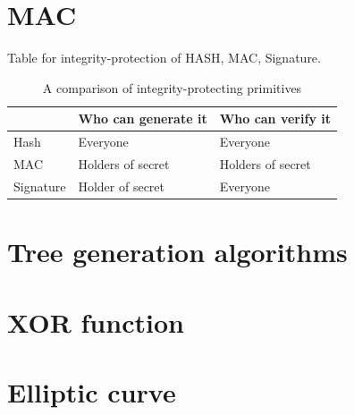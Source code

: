 \section{MAC}

Table for integrity-protection of HASH, MAC, Signature.
\begin{table}[!htb]	
	\begin{center}
		\begin{tabular}{ |l| l| l| }
	    \hline
	     & Who can generate it & Who can verify it \\
	    \hline
	    Hash & Everyone & Everyone \\	
	    \hline
	    MAC & Holders of secret & Holders of secret \\
	    \hline
	    Signature & Holder of secret & Everyone \\
	    \hline
		\end{tabular}
	\end{center}
	\caption{A comparison of integrity-protecting primitives}
  \label{table:digital-certificate}
\end{table}

\section {Tree generation algorithms}

\section{XOR function}

\section{Elliptic curve}